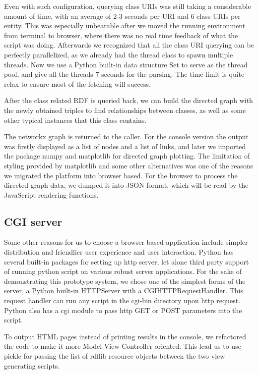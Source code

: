 \documentclass[12pt]{cls}
\begin{document}
Even with such configuration, querying class URIs was still taking a considerable amount of time, with an average of 2-3 seconds per URI and 6 class URIs per entity. This was especially unbearable after we moved the running environment from terminal to browser, where there was no real time feedback of what the script was doing. Afterwards we recognized that all the class URI querying can be perfectly parallelized, as we already had the thread class to spawn multiple threads. Now we use a Python built-in data structure Set to serve as the thread pool, and give all the threads 7 seconds for the parsing. The time limit is quite relax to ensure most of the fetching will success.

After the class related RDF is queried back, we can build the directed graph with the newly obtained triples to find relationships between classes, as well as some other typical instances that this class contains.

The networkx graph is returned to the caller. For the console version the output was firstly displayed as a list of nodes and a list of links, and later we imported the package numpy and matplotlib for directed graph plotting. The limitation of styling provided by matplotlib and some other alternatives was one of the reasons we migrated the platform into browser based. For the browser to process the directed graph data, we dumped it into JSON format, which will be read by the JavaScript rendering functions.

\subsection{CGI server}

Some other reasons for us to choose a browser based application include simpler distribution and friendlier user experience and user interaction. Python has several built-in packages for setting up http server, let alone third party support of running python script on various robust server applications. For the sake of demonstrating this prototype system, we chose one of the simplest forms of the server, a Python built-in HTTPServer with a CGIHTTPRequestHandler. This request handler can run any script in the cgi-bin directory upon http request. Python also has a cgi module to pass http GET or POST parameters into the script.

To output HTML pages instead of printing results in the console, we refactored the code to make it more Model-View-Controller oriented. This lead us to use pickle for passing the list of rdflib resource objects between the two view generating scripts.
\end{document}
